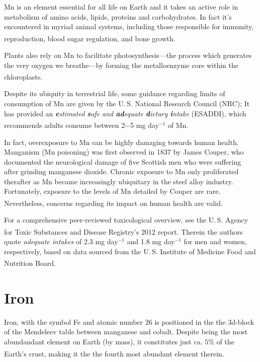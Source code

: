 Mn is an element essential for all life on Earth and it takes an active role in metabolism of amino acids, lipids, proteins and carbohydrates. In fact it's encountered in myriad animal systems, including those responsible for immunity, reproduction, blood sugar regulation, and bone growth.\textsuperscript{\cite{banci:2012}}

Plants also rely on Mn to facilitate photosynthesis---the process which generates the very oxygen we breathe---by forming the metalloenzyme core within the chloroplasts.\textsuperscript{\cite{banci:2012}}

Despite its ubiquity in terrestrial life, some guidance regarding limits of consumption of Mn are given by the U.\,S. National Research Council (NRC); It has provided an \textit{\textbf{e}stimated \textbf{s}afe and \textbf{ad}equate \textbf{d}ietary \textbf{i}ntake} (ESADDI), which recommends adults consume between 2$-$5 mg day$^{-1}$ of Mn.\textsuperscript{\cite{banci:2012}}

In fact, overexposure to Mn can be highly damaging towards human health. Manganism (Mn poisoning) was first observed in 1837 by James Couper, who documented the neurological damage of five Scottish men who were suffering after grinding manganese dioxide. Chronic exposure to Mn only proliferated therafter as Mn became increasingly ubiquitary in the steel alloy industry. Fortunately, exposure to the levels of Mn detailed by Couper are rare. Nevertheless, concerns regarding its impact on human health are valid.\textsuperscript{\cite{costa:2014}}

For a comprehensive peer-reviewed toxicological overview, see the U.\,S. Agency for Toxic Substances and Disease Registry's 2012 report.\textsuperscript{\cite{williams:2012}} Therein the authors quote \textit{adequate intakes} of 2.3 mg day$^{-1}$ and 1.8 mg day$^{-1}$ for men and women, respectively, based on data sourced from the U.\,S. Institute of Medicine Food and Nutrition Board.\textsuperscript{\cite{trumbo:2001}}

\section{Iron}

Iron, with the symbol Fe and atomic number $26$ is positioned in the the $3$d-block of the Mendeleev table between manganese and cobalt. Despite being the most abundandant element on Earth (by mass), it constitutes just ca. $5$\% of the Earth's crust, making it the the fourth most abundant element therein.\textsuperscript{\cite{nicholls:1973}}

